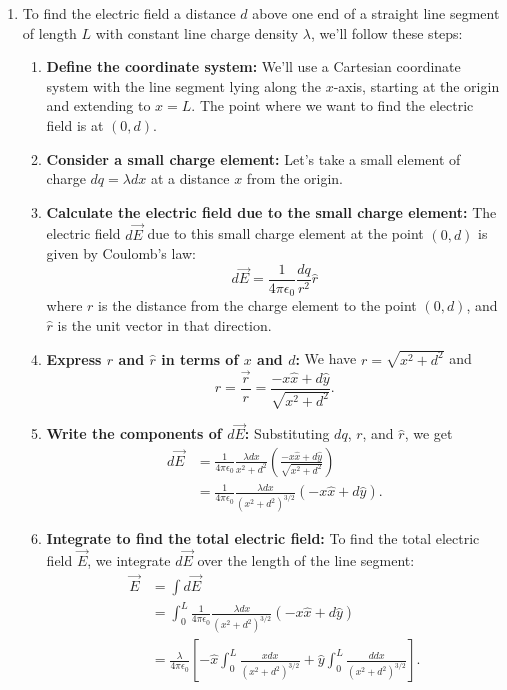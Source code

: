 \documentclass{article}
\begin{document}
\begin{enumerate}
\item To find the electric field a distance \(d\) above one end of a straight line segment of length \(L\) with constant line charge density \(\lambda\), we'll follow these steps:

\begin{enumerate}
\item \textbf{Define the coordinate system:}  We'll use a Cartesian coordinate system with the line segment lying along the \(x\)-axis, starting at the origin and extending to \(x=L\). The point where we want to find the electric field is at \((0,d)\).

\item \textbf{Consider a small charge element:}  Let's take a small element of charge \(dq = \lambda dx\) at a distance \(x\) from the origin.

\item \textbf{Calculate the electric field due to the small charge element:} The electric field \(d\vec{E}\) due to this small charge element at the point \((0,d)\) is given by Coulomb's law:
    \[d\vec{E} = \frac{1}{4\pi\epsilon_0} \frac{dq}{r^2} \hat{r}\]
    where \(r\) is the distance from the charge element to the point \((0,d)\), and \(\hat{r}\) is the unit vector in that direction.

\item \textbf{Express \(r\) and \(\hat{r}\) in terms of \(x\) and \(d\):} We have \(r = \sqrt{x^2 + d^2}\) and 
    \[\hat{r} = \frac{\vec{r}}{r} = \frac{-x\hat{x} + d\hat{y}}{\sqrt{x^2 + d^2}}.\]

\item \textbf{Write the components of \(d\vec{E}\):}  Substituting \(dq\), \(r\), and \(\hat{r}\), we get
    \begin{align*}
    d\vec{E} &= \frac{1}{4\pi\epsilon_0} \frac{\lambda dx}{x^2 + d^2} \left(\frac{-x\hat{x} + d\hat{y}}{\sqrt{x^2 + d^2}}\right) \\
    &= \frac{1}{4\pi\epsilon_0} \frac{\lambda dx}{(x^2 + d^2)^{3/2}} (-x\hat{x} + d\hat{y}).
    \end{align*}

\item \textbf{Integrate to find the total electric field:} To find the total electric field \(\vec{E}\), we integrate \(d\vec{E}\) over the length of the line segment:
    \begin{align*}
    \vec{E} &= \int d\vec{E} \\
    &= \int_0^L \frac{1}{4\pi\epsilon_0} \frac{\lambda dx}{(x^2 + d^2)^{3/2}} (-x\hat{x} + d\hat{y}) \\
    &= \frac{\lambda}{4\pi\epsilon_0} \left[ -\hat{x} \int_0^L \frac{x dx}{(x^2 + d^2)^{3/2}} + \hat{y} \int_0^L \frac{d dx}{(x^2 + d^2)^{3/2}} \right].
    \end{align*}


\end{enumerate}
\end{enumerate}
\end{document}
